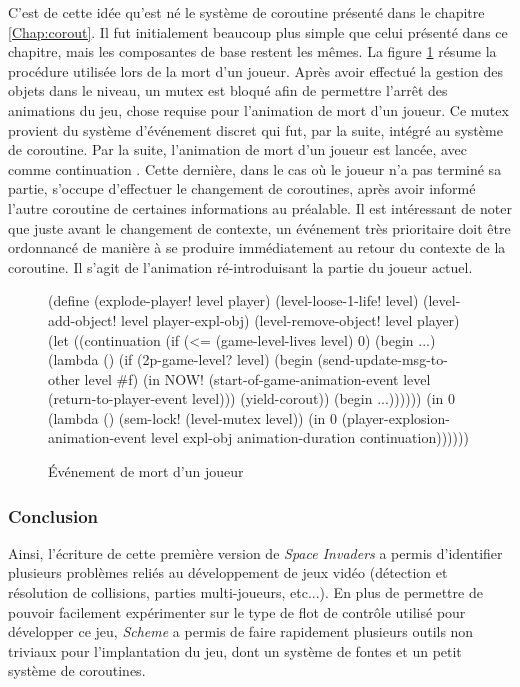 \documentclass[12pt,twoside,letterpaper,francais]{book}
\newcommand{\si}{{\textit{Space Invaders }}}
\newcommand{\Schemelang}{{\textit{Scheme }}}
\newcommand{\scheme}[1]{\selectlanguage{english}{\tt #1}\selectlanguage{french}}
\begin{document}
C'est de cette idée qu'est né le système de coroutine présenté dans le
chapitre \ref{Chap:corout}. Il fut initialement beaucoup plus simple
que celui présenté dans ce chapitre, mais les composantes de base
restent les mêmes. La figure \ref{Exp:si-mort} résume la procédure
utilisée lors de la mort d'un joueur. Après avoir effectué la gestion
des objets dans le niveau, un mutex est bloqué afin de permettre
l'arrêt des animations du jeu, chose requise pour l'animation de mort
d'un joueur. Ce mutex provient du système d'événement discret qui fut,
par la suite, intégré au système de coroutine. Par la suite,
l'animation de mort d'un joueur est lancée, avec comme continuation
\scheme{continuation}. Cette dernière, dans le cas où le joueur n'a
pas terminé sa partie, s'occupe d'effectuer le changement de
coroutines, après avoir informé l'autre coroutine de certaines
informations au préalable. Il est intéressant de noter que juste avant
le changement de contexte, un événement très prioritaire doit être
ordonnancé de manière à se produire immédiatement au retour du
contexte de la coroutine. Il s'agit de l'animation ré-introduisant la
partie du joueur actuel.

\begin{figure}[htb!]
  \begin{schemecode}
(define (explode-player! level player)
  (level-loose-1-life! level)
  (level-add-object! level player-expl-obj)
  (level-remove-object! level player)
  (let ((continuation
         (if (<= (game-level-lives level) 0)
             (begin ...)
             (lambda ()
               (if (2p-game-level? level)
                   (begin
                     (send-update-msg-to-other level \#f)
                     (in NOW! (start-of-game-animation-event
                               level (return-to-player-event level)))
                     (yield-corout))
                   (begin ...))))))
     (in 0 (lambda ()
            (sem-lock! (level-mutex level))
            (in 0 (player-explosion-animation-event
                   level expl-obj animation-duration continuation))))))
   \end{schemecode}
  \caption{Événement de mort d'un joueur}
  \label{Exp:si-mort}
\end{figure}


\FloatBarrier
\subsubsection{Conclusion}
Ainsi, l'écriture de cette première version de \si a permis
d'identifier plusieurs problèmes reliés au développement de jeux vidéo
(détection et résolution de collisions, parties multi-joueurs,
etc...). En plus de permettre de pouvoir facilement expérimenter sur
le type de flot de contrôle utilisé pour développer ce jeu, \Schemelang a
permis de faire rapidement plusieurs outils non triviaux pour
l'implantation du jeu, dont un système de fontes et un petit système
de coroutines.
\end{document}
